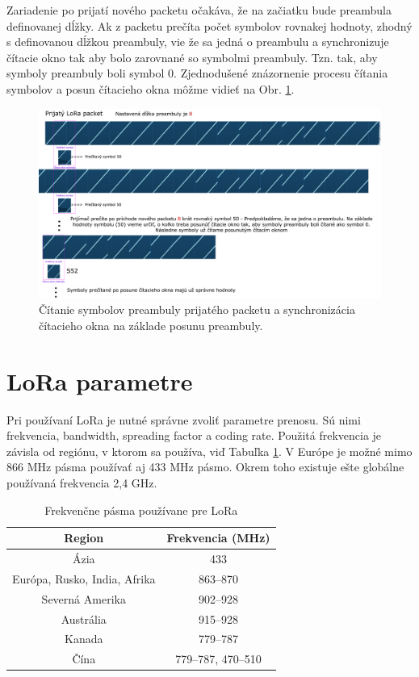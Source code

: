 \documentclass[slovak,master]{diploma}
\begin{document}
Zariadenie po prijatí nového packetu očakáva, že na začiatku bude preambula definovanej dĺžky. Ak z packetu prečíta počet symbolov rovnakej hodnoty, zhodný 
s definovanou dĺžkou preambuly, vie že sa jedná o preambulu a synchronizuje čítacie okno tak aby bolo zarovnané so symbolmi preambuly. Tzn. tak, aby symboly preambuly boli 
symbol 0. Zjednodušené znázornenie procesu čítania symbolov a posun čítacieho okna môžme vidieť na Obr. \ref{fig:loraPreamble1}.

\begin{figure}[h!]
	\centering
	\includegraphics[width=1\textwidth]{Figures/preambulaSmall.png}
	\caption{Čítanie symbolov preambuly prijatého packetu a synchronizácia čítacieho okna na základe posunu preambuly.}
	\label{fig:loraPreamble1}
\end{figure}

\newpage
\section{LoRa parametre}
Pri používaní LoRa je nutné správne zvoliť parametre prenosu. Sú nimi frekvencia, bandwidth, spreading factor a coding rate.
Použitá frekvencia je závisla od regiónu, v ktorom sa používa, viď Tabuľka \ref{tab:ismBands}. 
V Európe je možné mimo 866 MHz pásma používať aj 433 MHz pásmo. Okrem toho existuje ešte globálne používaná frekvencia 2,4 GHz.

\begin{table}[h!]
	\centering
  \small
  \setlength\tabcolsep{6pt}
	\caption[Frekvenčne pásma používane pre LoRa]{Frekvenčne pásma používane pre LoRa}
  \begin{tabular}{c|c}
    \toprule
    Region & Frekvencia (MHz)\\
    \midrule
    Ázia & 433 \\
    Európa, Rusko, India, Afrika & 863--870 \\
    Severná Amerika & 902--928 \\
    Austrália & 915--928 \\
    Kanada & 779--787 \\
    Čína & 779--787, 470--510 \\
    \midrule
  \end{tabular}
  \label{tab:ismBands}
\end{table}
\end{document}
